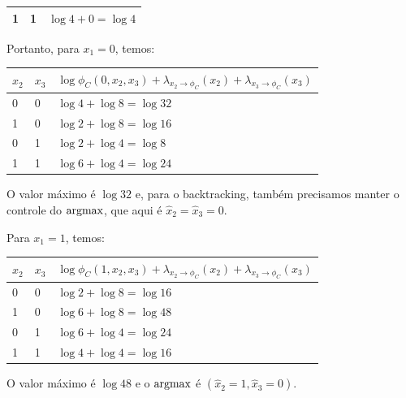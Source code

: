 \begin{exenumerate}
\begin{solution}
\begin{center}
\begin{tabular}{lll}
                1 & 1 & $\log 4 + 0 = \log 4$\\
                \bottomrule
            \end{tabular}
        \end{center}
        Portanto, para $x_1=0$, temos:
        \begin{center}
            \begin{tabular}{lll}
                \toprule
                $x_2$ & $x_3$ & $\log \phi_C(0, x_2, x_3) + \lambda_{x_2 \to \phi_C}(x_2) + \lambda_{x_3 \to \phi_C}(x_3)$\\
                \midrule
                0 & 0 & $\log 4 + \log 8 = \log 32$  \\
                1 & 0 & $\log 2 + \log 8 = \log 16$ \\
                0 & 1 & $\log 2 + \log 4 = \log 8$  \\
                1 & 1 & $\log 6 + \log 4 = \log 24$ \\
                \bottomrule
            \end{tabular}
        \end{center}
        O valor m\'aximo \'e $\log 32$ e, para o backtracking, tamb\'em
        precisamos manter o controle do $\operatorname*{\mathrm{argmax}}$, que aqui \'e
        $\hat{x}_2=\hat{x}_3=0$.
        
        Para $x_1=1$, temos:
        \begin{center}
            \begin{tabular}{lll}
                \toprule
                $x_2$ & $x_3$ & $\log \phi_C(1, x_2, x_3) + \lambda_{x_2 \to \phi_C}(x_2) + \lambda_{x_3 \to \phi_C}(x_3)$\\
                \midrule
                0 & 0 & $\log 2 + \log 8 = \log 16 $  \\
                1 & 0 & $\log 6 + \log 8 = \log 48$\\
                0 & 1 & $\log 6 + \log 4 = \log 24$ \\
                1 & 1 & $\log 4 + \log 4 = \log 16$ \\
                \bottomrule
            \end{tabular}
        \end{center}
        O valor m\'aximo \'e $\log 48$ e o $\operatorname*{\mathrm{argmax}}$ \'e $(\hat{x}_2=1, \hat{x}_3=0)$.
        

\end{solution}
\end{exenumerate}
